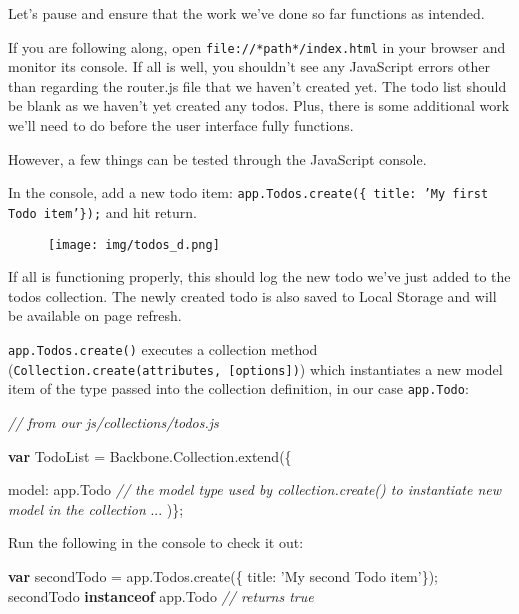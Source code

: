 \documentclass[9pt]{book}
\newenvironment{Shaded}{}{}
\newcommand{\KeywordTok}[1]{\textcolor[rgb]{0.00,0.44,0.13}{\textbf{{#1}}}}
\newcommand{\DataTypeTok}[1]{\textcolor[rgb]{0.56,0.13,0.00}{{#1}}}
\newcommand{\StringTok}[1]{\textcolor[rgb]{0.25,0.44,0.63}{{#1}}}
\newcommand{\CommentTok}[1]{\textcolor[rgb]{0.38,0.63,0.69}{\textit{{#1}}}}
\newcommand{\OtherTok}[1]{\textcolor[rgb]{0.00,0.44,0.13}{{#1}}}
\newcommand{\FunctionTok}[1]{\textcolor[rgb]{0.02,0.16,0.49}{{#1}}}
\newcommand{\NormalTok}[1]{{#1}}
\begin{document}
Let's pause and ensure that the work we've done so far functions as
intended.

If you are following along, open \texttt{file://*path*/index.html} in
your browser and monitor its console. If all is well, you shouldn't see
any JavaScript errors other than regarding the router.js file that we
haven't created yet. The todo list should be blank as we haven't yet
created any todos. Plus, there is some additional work we'll need to do
before the user interface fully functions.

However, a few things can be tested through the JavaScript console.

In the console, add a new todo item:
\texttt{app.Todos.create(\{ title: 'My first Todo item'\});} and hit
return.

\begin{figure}[htbp]
\centering
\texttt{[image: img/todos\_d.png]}
\end{figure}

If all is functioning properly, this should log the new todo we've just
added to the todos collection. The newly created todo is also saved to
Local Storage and will be available on page refresh.

\texttt{app.Todos.create()} executes a collection method
(\texttt{Collection.create(attributes, {[}options{]})}) which
instantiates a new model item of the type passed into the collection
definition, in our case \texttt{app.Todo}:

\begin{Shaded}
\begin{Highlighting}[]

  \CommentTok{// from our js/collections/todos.js}

  \KeywordTok{var} \NormalTok{TodoList = }\OtherTok{Backbone}\NormalTok{.}\OtherTok{Collection}\NormalTok{.}\FunctionTok{extend}\NormalTok{(\{}

      \DataTypeTok{model}\NormalTok{: }\OtherTok{app}\NormalTok{.}\FunctionTok{Todo} \CommentTok{// the model type used by collection.create() to instantiate new model in the collection}
      \NormalTok{...}
  \NormalTok{)\};}
\end{Highlighting}
\end{Shaded}

Run the following in the console to check it out:

\begin{Shaded}
\begin{Highlighting}[]
\KeywordTok{var} \NormalTok{secondTodo = }\OtherTok{app}\NormalTok{.}\OtherTok{Todos}\NormalTok{.}\FunctionTok{create}\NormalTok{(\{ }\DataTypeTok{title}\NormalTok{: }\StringTok{'My second Todo item'}\NormalTok{\});}
\NormalTok{secondTodo }\KeywordTok{instanceof} \OtherTok{app}\NormalTok{.}\FunctionTok{Todo} \CommentTok{// returns true}
\end{Highlighting}
\end{Shaded}
\end{document}
